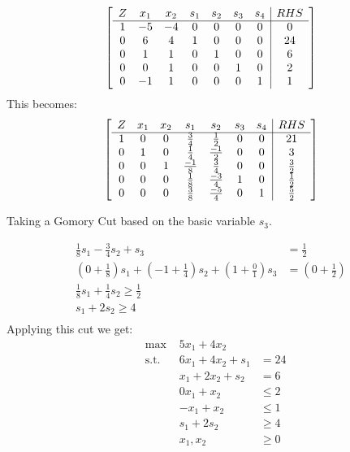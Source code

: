 \documentclass[10pt, letterpaper]{paper}
\begin{document}
\[
	\left[ {\begin{array}{ccccccc|c}
	Z & x_1 & x_2 & s_1 & s_2 & s_3 &s_4 & RHS\\ \cline{1-8}
	1 & -5 & -4 & 0 & 0 & 0 & 0 & 0 \\
	0 & 6 & 4 & 1 & 0 &0 & 0 &24\\
	0 & 1 & 1 & 0& 1 & 0 &0 & 6\\
	0 & 0 & 1 & 0 & 0 & 1 &0 & 2 \\
	0 & -1 & 1 & 0 & 0 & 0 &1 & 1 \\
	\end{array} } \right]
\]
This becomes:
\[
	\left[ {\begin{array}{ccccccc|c}
	Z & x_1 & x_2 & s_1 & s_2 & s_3 &s_4 & RHS\\ \cline{1-8}
	1 & 0 & 0 & \frac{3}{4} & \frac{1}{2} & 0 & 0 & 21\\
	0 & 1 & 0 & \frac{1}{4} & \frac{-1}{2} &0 & 0 &3\\
	0 & 0 & 1 & \frac{-1}{8}& \frac{3}{4} & 0 &0 & \frac{3}{2}\\
	0 & 0 & 0 & \frac{1}{8} & \frac{-3}{4} & 1 &0 & \frac{1}{2} \\
	0 & 0 & 0 & \frac{3}{8} & \frac{-5}{4} & 0 &1 & \frac{5}{2} \\
	\end{array} } \right]
\]

Taking a Gomory Cut based on the basic variable $s_3$.

\begin{align*}
\frac{1}{8} s_1 - \frac{3}{4} s_2 + s_3 &= \frac{1}{2}\\
(0 + \frac{1}{8}) s_1 + ( -1 + \frac{1}{4} )s_2 + (1 + \frac{0}{1})s_3 &= ( 0 + \frac{1}{2} )\\
\frac{1}{8} s_1 +\frac{1}{4} s_2 \geq \frac{1}{2}\\
s_1 + 2s_2 \geq 4\\
\end{align*}
Applying this cut we get: 
\begin{equation*}
\begin{alignedat}{3}
&\text{max }&5x_1 + 4x_2&\\
&\text{s.t. } &6x_1 +4x_2 + s_1 &= 24\\
& &x_1 + 2x_2 + s_2 &= 6\\
& &0x_1 + x_2 &\leq 2\\
& &-x_1 + x_2 &\leq 1\\
& & s_1 + 2s_2 &\geq 4\\
& &x_1, x_2 &\geq 0
\end{alignedat}
\end{equation*}
\end{document}
